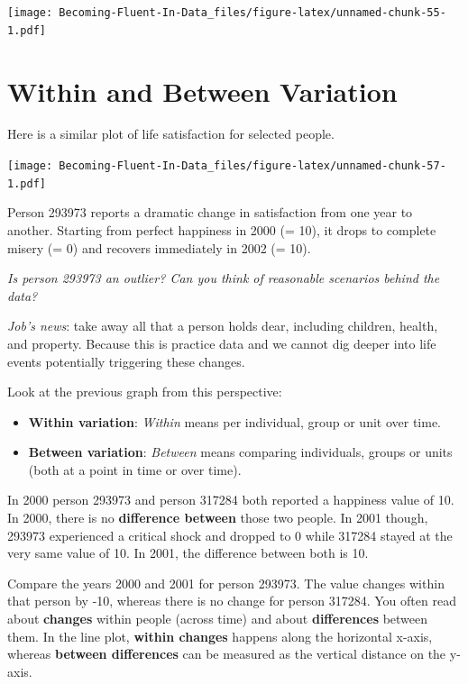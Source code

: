 \documentclass[
]{book}
\providecommand{\tightlist}{%
  \setlength{\itemsep}{0pt}\setlength{\parskip}{0pt}}
\begin{document}
\texttt{[image: Becoming-Fluent-In-Data\_files/figure-latex/unnamed-chunk-55-1.pdf]}

\hypertarget{within-and-between-variation}{%
\section{Within and Between Variation}\label{within-and-between-variation}}

Here is a similar plot of life satisfaction for selected people.

\texttt{[image: Becoming-Fluent-In-Data\_files/figure-latex/unnamed-chunk-57-1.pdf]}

Person 293973 reports a dramatic change in satisfaction from one year to another. Starting from perfect happiness in 2000 (= 10), it drops to complete misery (= 0) and recovers immediately in 2002 (= 10).

\emph{Is person 293973 an outlier? Can you think of reasonable scenarios behind the data? }

\emph{Job's news}: take away all that a person holds dear, including children, health, and property. Because this is practice data and we cannot dig deeper into life events potentially triggering these changes.

Look at the previous graph from this perspective:

\begin{itemize}
\tightlist
\item
  \textbf{Within variation}: \emph{Within} means per individual, group or unit over time.
\item
  \textbf{Between variation}: \emph{Between} means comparing individuals, groups or units (both at a point in time or over time).
\end{itemize}

In 2000 person 293973 and person 317284 both reported a happiness value of 10. In 2000, there is no \textbf{difference between} those two people. In 2001 though, 293973 experienced a critical shock and dropped to 0 while 317284 stayed at the very same value of 10. In 2001, the difference between both is 10.

Compare the years 2000 and 2001 for person 293973. The value changes within that person by -10, whereas there is no change for person 317284. You often read about \textbf{changes} within people (across time) and about \textbf{differences} between them. In the line plot, \textbf{within changes} happens along the horizontal x-axis, whereas \textbf{between differences} can be measured as the vertical distance on the y-axis.
\end{document}
